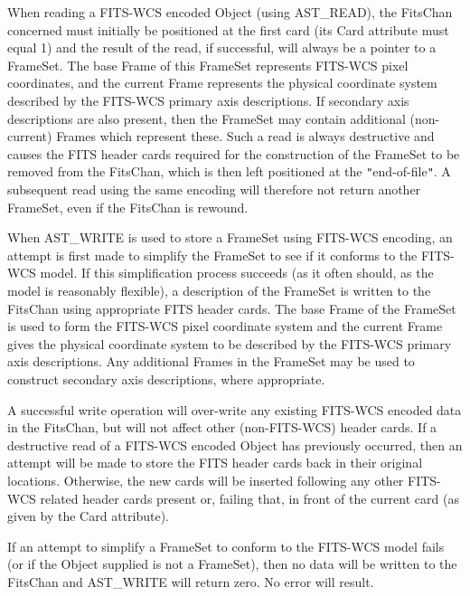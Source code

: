 \documentclass[twoside,11pt]{article}
\begin{document}
{{      When reading a FITS-WCS encoded Object (using AST\_READ), the FitsChan
      concerned must initially be positioned at the first card (its
      Card attribute must equal 1) and the result of the read, if
      successful, will always be a pointer to a FrameSet. The base
      Frame of this FrameSet represents FITS-WCS pixel coordinates,
      and the current Frame represents the physical coordinate system
      described by the FITS-WCS primary axis descriptions. If
      secondary axis descriptions are also present, then the FrameSet
      may contain additional (non-current) Frames which represent
      these.  Such a read is always destructive and causes the FITS
      header cards required for the construction of the FrameSet to be
      removed from the FitsChan, which is then left positioned at the
      {\tt{"}}end-of-file{\tt{"}}. A subsequent read using the same encoding will
      therefore not return another FrameSet, even if the FitsChan is
      rewound.

      When AST\_WRITE is used to store a FrameSet using FITS-WCS
      encoding, an attempt is first made to simplify the FrameSet to
      see if it conforms to the FITS-WCS model. If this simplification
      process succeeds (as it often should, as the model is reasonably
      flexible), a description of the FrameSet is written to the
      FitsChan using appropriate FITS header cards. The base Frame of
      the FrameSet is used to form the FITS-WCS pixel coordinate
      system and the current Frame gives the physical coordinate
      system to be described by the FITS-WCS primary axis
      descriptions.  Any additional Frames in the FrameSet may be used
      to construct secondary axis descriptions, where appropriate.

      A successful write operation will over-write any existing
      FITS-WCS encoded data in the FitsChan, but will not affect other
      (non-FITS-WCS) header cards. If a destructive read of a FITS-WCS
      encoded Object has previously occurred, then an attempt will be
      made to store the FITS header cards back in their original
      locations. Otherwise, the new cards will be inserted following
      any other FITS-WCS related header cards present or, failing
      that, in front of the current card (as given by the Card
      attribute).

      If an attempt to simplify a FrameSet to conform to the FITS-WCS
      model fails (or if the Object supplied is not a FrameSet), then
      no data will be written to the FitsChan and AST\_WRITE will
      return zero. No error will result.
   }
   }
\end{document}
